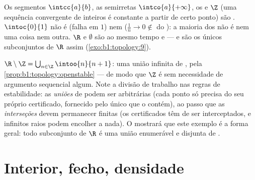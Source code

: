 \begin{example}\label{ex:b1:topology:closed}
Os segmentos $\intcc{a}{b}$, as semirretas $\intco{a}{+\infty}$, os  e $\Z$ (uma sequência convergente de inteiros é constante a
partir de certo ponto) são . $\intoc{0}{1}$ não é  (falha em
$1$) nem  ($\frac 1n \to 0 \notin$ do ): a maioria dos  não
é nem uma coisa nem outra. $\R$ e $\emptyset$ são ao mesmo tempo 
e  --- e são os únicos subconjuntos de $\R$ assim
(\cref{exo:b1:topology:9}).
\end{example}

\begin{example}\label{ex:b1:topology:rminusz}
$\R \setminus \Z = \bigcup_{n \in \Z} \intoo{n}{n+1}$: uma
união infinita de  ,  pela
\cref{prop:b1:topology:openstable} --- de modo que $\Z$ é  sem
necessidade de argumento sequencial algum. Note a divisão de trabalho
nas regras de estabilidade: as \emph{uniões} de  podem ser
arbitrárias (cada ponto só precisa do seu próprio certificado,
fornecido pelo único  que o contém), ao passo que as
\emph{interseções} devem permanecer finitas (os certificados têm de ser
interceptados, e infinitos raios podem encolher a nada). O
 mostrará que este exemplo é a forma geral: todo
subconjunto  de $\R$ é uma união enumerável e disjunta de
 .
\end{example}

\section{Interior, fecho, densidade}

